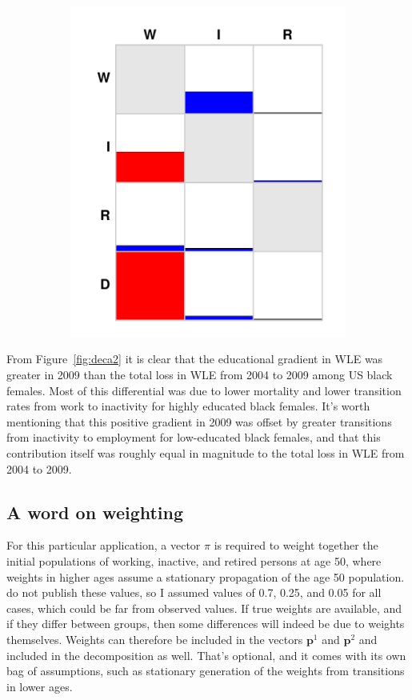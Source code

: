 \documentclass{article}
\begin{document}
\begin{figure}
\begin{subfigure}{.4\textwidth}
  \includegraphics[width=.7\linewidth]{Figures/decB.pdf}
\end{subfigure}
\end{figure}

From Figure~\ref{fig:deca2} it is clear that the educational gradient in WLE was
greater in 2009 than the total loss in WLE from 2004 to 2009 among US black
females. Most of this differential was due to lower mortality and lower
transition rates from work to inactivity for highly educated black females. It's
worth mentioning that this positive gradient in 2009 was offset by greater
transitions from inactivity to employment for low-educated black females, and
that this contribution itself was roughly equal in magnitude to the total loss
in WLE from 2004 to 2009.

\subsection{A word on weighting}
For this particular application, a vector $\pi$ is required to weight together
the initial populations of working, inactive, and retired persons at age 50,
where weights in higher ages assume a stationary propagation of the age 50
population.
\citet{Dudel2017} do not publish these values, so I assumed values of 0.7,
0.25, and 0.05 for all cases, which could be far from observed values. If true
weights are available, and if they differ between groups, then some differences
will indeed be due to weights themselves. Weights can therefore be included in
the vectors $\textbf{p}^1$ and $\textbf{p}^2$ and included in the decomposition
as well. That's optional, and it comes with its own bag of assumptions, such as
stationary generation of the weights from transitions in lower ages.
\end{document}
